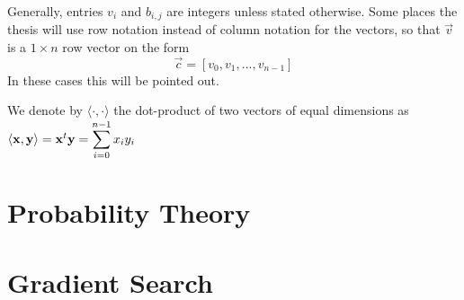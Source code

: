Generally, entries $v_i$ and $b_{i, j}$ are integers unless stated otherwise.
Some places the thesis will use row notation instead of column notation for the vectors, so that $\vec{v}$ is a $1 \times n$ row vector on the form
\[\vec{c} = [v_0, v_1, ..., v_{n-1}]\] In these cases this will be pointed out.

We denote by $\langle \cdot, \cdot \rangle$ the dot-product of two vectors of equal dimensions as \\
$\langle \vec{x}, \vec{y} \rangle = \vec{x}^t \vec{y} = \mathlarger{\sum_{i=0}^{n-1} x_i y_i}$
\section{Probability Theory}
\section{Gradient Search}
